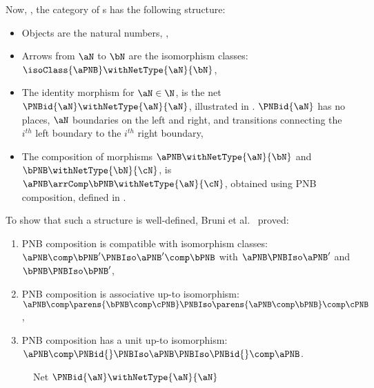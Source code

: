 Now, \PNBCat{}, the category of \PNB{}s has the following structure:
\begin{itemize}
\item Objects are the natural numbers, \N,
\item Arrows from $\aN$ to $\bN$ are the \PNB{} isomorphism classes:
    $\isoClass{\aPNB} \withNetType{\aN}{\bN}$,
\item The identity morphism for $\aN \in \N$, is the net $\PNBid{\aN}
    \withNetType{\aN}{\aN}$,
    illustrated in . $\PNBid{\aN}$ has no places, $\aN$
    boundaries on the left and right, and transitions connecting the $i^{th}$
    left boundary to the $i^{th}$ right boundary,
\item The composition of morphisms $\aPNB \withNetType{\aN}{\bN}$ and $\bPNB
    \withNetType{\bN}{\cN}$, is $\aPNB \arrComp \bPNB \withNetType{\aN}{\cN}$,
    obtained using PNB composition, defined in
    .
\end{itemize}

To show that such a structure is well-defined, {Bruni et al.}~\cite[Proposition
5.1]{Bruni2013} proved:
\begin{enumerate}
    \item PNB composition is compatible with isomorphism classes:
        $\aPNB \comp \bPNB' \PNBIso \aPNB' \comp \bPNB$ with $\aPNB \PNBIso
        \aPNB'$ and $\bPNB \PNBIso \bPNB'$,
    \item PNB composition is associative up-to isomorphism: $\aPNB \comp
        \parens{\bPNB \comp \cPNB} \PNBIso \parens{\aPNB \comp \bPNB} \comp
        \cPNB$,
\item PNB composition has a unit up-to isomorphism: $\aPNB \comp \PNBid{}
    \PNBIso \aPNB \PNBIso \PNBid{} \comp \aPNB$.
\end{enumerate}

\begin{figure}[ht]
    \centering
\caption{Net $\PNBid{\aN} \withNetType{\aN}{\aN}$}
\label{fig:netIdn}
\end{figure}

